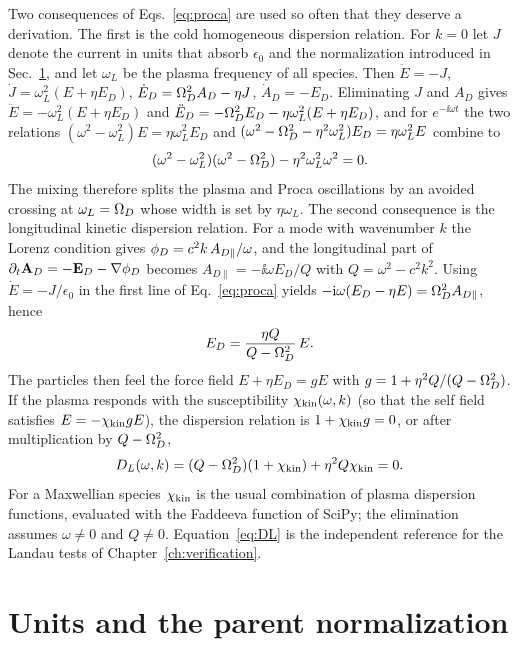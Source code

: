 Two consequences of Eqs.~\eqref{eq:proca} are used so often that they deserve a derivation. The first is the cold homogeneous dispersion relation. For $k=0$ let $J$ denote the current in units that absorb $\epsilon_0$ and the normalization introduced in Sec.~\ref{sec:units-parent}, and let $\omega_L$ be the plasma frequency of all species. Then $\dot E=-J$, $\dot J=\omega_L^2(E+\eta E_D)$, $\dot E_D=\Omega_D^2A_D-\eta J$, $\dot A_D=-E_D$. Eliminating $J$ and $A_D$ gives $\ddot E=-\omega_L^2(E+\eta E_D)$ and $\ddot E_D=-\Omega_D^2E_D-\eta\omega_L^2(E+\eta E_D)$, and for $e^{-\ii\omega t}$ the two relations $(\omega^2-\omega_L^2)E=\eta\omega_L^2E_D$ and $(\omega^2-\Omega_D^2-\eta^2\omega_L^2)E_D=\eta\omega_L^2E$ combine to
\begin{equation}
(\omega^2-\omega_L^2)(\omega^2-\Omega_D^2)-\eta^2\omega_L^2\omega^2=0 .
\label{eq:coldroots}
\end{equation}
The mixing therefore splits the plasma and Proca oscillations by an avoided crossing at $\omega_L=\Omega_D$ whose width is set by $\eta\omega_L$. The second consequence is the longitudinal kinetic dispersion relation. For a mode with wavenumber $k$ the Lorenz condition gives $\phi_D=c^2k\,A_{D\parallel}/\omega$, and the longitudinal part of $\partial_t\mathbf{A}_D=-\mathbf{E}_D-\nabla\phi_D$ becomes $A_{D\parallel}=-\ii\omega E_D/Q$ with $Q=\omega^2-c^2k^2$. Using $\dot E=-J/\epsilon_0$ in the first line of Eq.~\eqref{eq:proca} yields $-\mathrm{i}\omega(E_D-\eta E)=\Omega_D^2A_{D\parallel}$, hence
\begin{equation}
E_D=\frac{\eta Q}{Q-\Omega_D^2}\,E .
\label{eq:EDratio}
\end{equation}
The particles then feel the force field $E+\eta E_D=gE$ with $g=1+\eta^2Q/(Q-\Omega_D^2)$. If the plasma responds with the susceptibility $\chi_{\rm kin}(\omega,k)$ (so that the self field satisfies $E=-\chi_{\rm kin}gE$), the dispersion relation is $1+\chi_{\rm kin}g=0$, or after multiplication by $Q-\Omega_D^2$,
\begin{equation}
D_L(\omega,k)=(Q-\Omega_D^2)(1+\chi_{\rm kin})+\eta^2Q\chi_{\rm kin}=0 .
\label{eq:DL}
\end{equation}
For a Maxwellian species $\chi_{\rm kin}$ is the usual combination of plasma dispersion functions, evaluated with the Faddeeva function of SciPy; the elimination assumes $\omega\neq0$ and $Q\neq0$. Equation~\eqref{eq:DL} is the independent reference for the Landau tests of Chapter~\ref{ch:verification}.

\section{Units and the parent normalization}\label{sec:units-parent}

